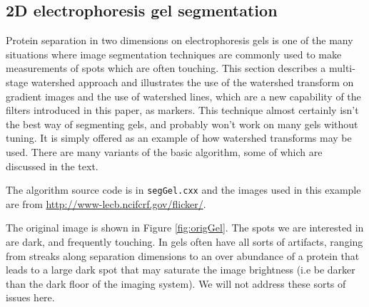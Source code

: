 \documentclass{InsightArticle}
\begin{document}
\subsection{2D electrophoresis gel segmentation}
Protein separation in two dimensions on electrophoresis gels is one of
the many situations where image segmentation techniques are commonly
used to make measurements of spots which are often touching. This
section describes a multi-stage watershed approach and illustrates the
use of the watershed transform on gradient images and the use of
watershed lines, which are a new capability of the filters introduced
in this paper, as markers. This technique almost certainly isn't the
best way of segmenting gels, and probably won't work on many gels
without tuning. It is simply offered as an example of how watershed
transforms may be used. There are many variants of the basic
algorithm, some of which are discussed in the text.

The algorithm source code is in {\tt segGel.cxx} and the images used
in this example are from \url{http://www-lecb.ncifcrf.gov/flicker/}.

The original image is shown in Figure \ref{fig:origGel}. The spots we
are interested in are dark, and frequently touching. In gels often
have all sorts of artifacts, ranging from streaks along separation
dimensions to an over abundance of a protein that leads to a large
dark spot that may saturate the image brightness (i.e be darker than
the dark floor of the imaging system). We will not address these sorts
of issues here.
\end{document}
